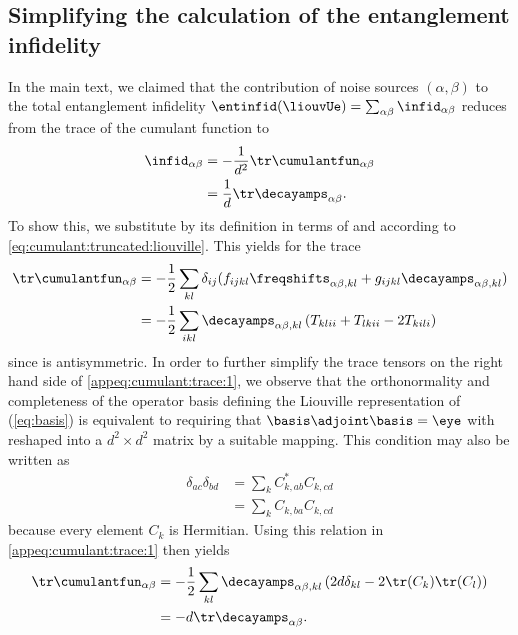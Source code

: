 \subsection{Simplifying the calculation of the entanglement infidelity}\label{appsec:derivations:fidelity}
In the main text, we claimed that the contribution of noise sources $(\alpha,\beta)$ to the total entanglement infidelity $\entinfid(\liouvUe) = \sum_{\alpha\beta}\infid_{\alpha\beta}$ reduces from the trace of the cumulant function \cumulantfun to
\begin{align}
    \infid_{\alpha\beta} &= -\frac{1}{d^2}\tr\cumulantfun_{\alpha\beta} \label{appeq:infid} \\
                         &= \frac{1}{d}\tr\decayamps_{\alpha\beta}.
\end{align}
To show this, we substitute \cumulantfun by its definition in terms of \freqshifts and \decayamps according to \cref{eq:cumulant:truncated:liouville}. This yields for the trace
\begin{equation}\label{appeq:cumulant:trace:1}
    \begin{split}
        \tr\cumulantfun_{\alpha\beta} &= -\frac{1}{2}\sum_{kl}\delta_{ij}(f_{ijkl}\freqshifts_{\alpha\beta,kl} + g_{ijkl}\decayamps_{\alpha\beta,kl}) \\
                                      &= -\frac{1}{2}\sum_{ikl}\decayamps_{\alpha\beta,kl}\left(T_{klii} + T_{lkii} - 2 T_{kili}\right)
    \end{split}
\end{equation}
since \freqshifts is antisymmetric. In order to further simplify the trace tensors on the right hand side of \cref{appeq:cumulant:trace:1}, we observe that the orthonormality and completeness of the operator basis \basis defining the Liouville representation of \cumulantfun (\cf \cref{eq:basis}) is equivalent to requiring that $\basis\adjoint\basis = \eye$ with \basis reshaped into a $d^2\times d^2$ matrix by a suitable mapping. This condition may also be written as
\begin{equation}\label{eq:basis:identity}
\begin{split}
    \delta_{ac}\delta_{bd} &= \sum_{k} C^\ast_{k,ab} C_{k,cd} \\
                           &= \sum_{k} C_{k,ba} C_{k,cd}
\end{split}
\end{equation}
because every element $C_k$ is Hermitian. Using this relation in \cref{appeq:cumulant:trace:1} then yields
\begin{equation}\label{appeq:cumulant:trace:2}
    \begin{split}
        \tr\cumulantfun_{\alpha\beta} &= -\frac{1}{2}\sum_{kl}\decayamps_{\alpha\beta,kl}\left(2d\delta_{kl} - 2\tr(C_k)\tr(C_l)\right) \\
                                      &= -d\tr\decayamps_{\alpha\beta}.
    \end{split}
\end{equation}
